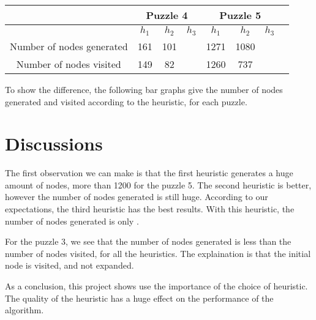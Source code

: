 \documentclass[]{article}
\begin{document}
\begin{center}
    \begin{tabular}{| c | c | c | c | c | c | c | c |}
      \cline{2-7} & \multicolumn{3}{|c|}{Puzzle 4} & \multicolumn{3}{|c|}{Puzzle 5} \\
      \hline
    & $h_1$ & $h_2$ & $h_3$ & $h_1$ & $h_2$& $h_3$ \\ \hline
    Number of nodes generated & 161 & 101 &       & 1271 & 1080 &   \\ \hline
    Number of nodes visited   & 149 & 82  &       & 1260 &  737 &  \\ \hline
    \end{tabular}
\end{center}

To show the difference, the following bar graphs give the number of nodes generated and visited according to the heuristic, for each puzzle.











\section{Discussions}

The first observation we can make is that the first heuristic generates a huge amount of nodes, more than 1200 for the puzzle 5.
The second heuristic is better, however the number of nodes generated is still huge.
According to our expectations, the third heuristic has the best results.
With this heuristic, the number of nodes generated is only .


For the puzzle 3, we see that the number of nodes generated is less than the number of nodes visited, for all the heuristics.
The explaination is that the initial node is visited, and not expanded.


As a conclusion, this project shows use the importance of the choice of heuristic.
The quality of the heuristic has a huge effect on the performance of the algorithm.
\end{document}
